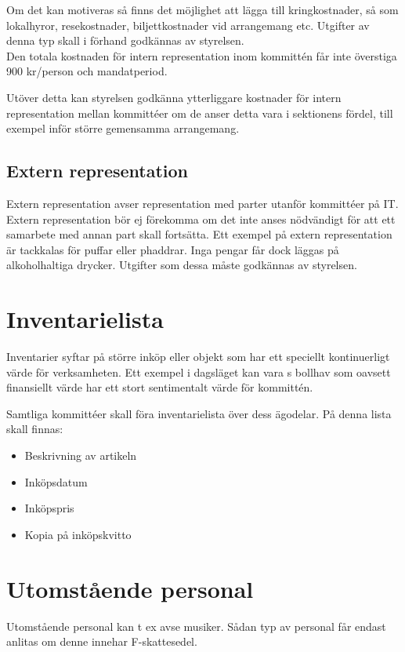 \documentclass[11pt, includeaddress]{classes/cthit}
\begin{document}
Om det kan motiveras så finns det möjlighet att lägga till kringkostnader, så som lokalhyror, resekostnader, biljettkostnader vid arrangemang etc. Utgifter av denna typ skall i förhand godkännas av styrelsen. \\

Den totala kostnaden för intern representation inom kommittén får inte överstiga 900 kr/person och mandatperiod. 

Utöver detta kan styrelsen godkänna ytterliggare kostnader för intern representation mellan kommittéer om de anser detta vara i sektionens fördel, till exempel inför större gemensamma arrangemang.

\subsection{Extern representation}
Extern representation avser representation med parter utanför kommittéer på IT. Extern representation bör ej förekomma om det inte anses nödvändigt för att ett samarbete med annan part skall fortsätta. Ett exempel på extern representation är tackkalas för puffar eller phaddrar. Inga pengar får dock läggas på alkoholhaltiga drycker. Utgifter som dessa måste godkännas av styrelsen.


\section{Inventarielista}
Inventarier syftar på större inköp eller objekt som har ett speciellt kontinuerligt värde för verksamheten. Ett exempel i dagsläget kan vara \NOLLKIT{}s bollhav som oavsett finansiellt värde har ett stort sentimentalt värde för kommittén.

Samtliga kommittéer skall föra inventarielista över dess ägodelar. På denna lista skall finnas:

\begin{itemize}
	\item Beskrivning av artikeln
	\item Inköpsdatum
	\item Inköpspris
	\item Kopia på inköpskvitto
\end{itemize}


\section{Utomstående personal}
Utomstående personal kan t ex avse musiker. Sådan typ av personal får endast anlitas om denne innehar F-skattesedel.
\end{document}

